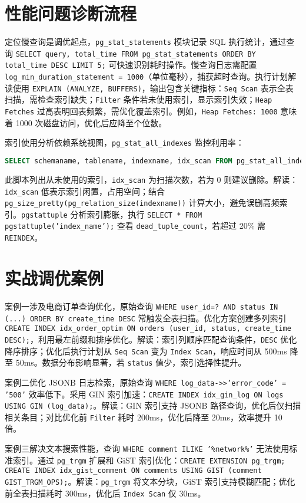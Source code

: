 \chapter{性能问题诊断流程}
定位慢查询是调优起点，\texttt{pg\_{}stat\_{}statements} 模块记录 SQL 执行统计，通过查询 \texttt{SELECT query, total\_{}time FROM pg\_{}stat\_{}statements ORDER BY total\_{}time DESC LIMIT 5;} 可快速识别耗时操作。慢查询日志需配置 \texttt{log\_{}min\_{}duration\_{}statement = 1000}（单位毫秒），捕获超时查询。执行计划解读使用 \texttt{EXPLAIN (ANALYZE, BUFFERS)}，输出包含关键指标：\texttt{Seq Scan} 表示全表扫描，需检查索引缺失；\texttt{Filter} 条件若未使用索引，显示索引失效；\texttt{Heap Fetches} 过高表明回表频繁，需优化覆盖索引。例如，\texttt{Heap Fetches: 1000} 意味着 1000 次磁盘访问，优化后应降至个位数。\par
索引使用分析依赖系统视图，\texttt{pg\_{}stat\_{}all\_{}indexes} 监控利用率：\par
\begin{lstlisting}[language=sql]
SELECT schemaname, tablename, indexname, idx_scan FROM pg_stat_all_indexes WHERE idx_scan = 0;
\end{lstlisting}
此脚本列出从未使用的索引，\texttt{idx\_{}scan} 为扫描次数，若为 0 则建议删除。解读：\texttt{idx\_{}scan} 低表示索引闲置，占用空间；结合 \texttt{pg\_{}size\_{}pretty(pg\_{}relation\_{}size(indexname))} 计算大小，避免误删高频索引。\texttt{pgstattuple} 分析索引膨胀，执行 \texttt{SELECT * FROM pgstattuple('index\_{}name');} 查看 \texttt{dead\_{}tuple\_{}count}，若超过 20\%{} 需 \texttt{REINDEX}。\par
\chapter{实战调优案例}
案例一涉及电商订单查询优化，原始查询 \texttt{WHERE user\_{}id=? AND status IN (...) ORDER BY create\_{}time DESC} 常触发全表扫描。优化方案创建多列索引 \texttt{CREATE INDEX idx\_{}order\_{}optim ON orders (user\_{}id, status, create\_{}time DESC);}，利用最左前缀和排序优化。解读：索引列顺序匹配查询条件，\texttt{DESC} 优化降序排序；优化后执行计划从 \texttt{Seq Scan} 变为 \texttt{Index Scan}，响应时间从 500ms 降至 50ms。数据分布影响显著，若 \texttt{status} 值少，索引选择性提升。\par
案例二优化 JSONB 日志检索，原始查询 \texttt{WHERE log\_{}data->>'error\_{}code' = '500'} 效率低下。采用 GIN 索引加速：\texttt{CREATE INDEX idx\_{}gin\_{}log ON logs USING GIN (log\_{}data);}。解读：GIN 索引支持 JSONB 路径查询，优化后仅扫描相关条目；对比优化前 \texttt{Filter} 耗时 200ms，优化后降至 20ms，效率提升 10 倍。\par
案例三解决文本搜索性能，查询 \texttt{WHERE comment ILIKE '\%{}network\%{}'} 无法使用标准索引。通过 \texttt{pg\_{}trgm} 扩展和 GiST 索引优化：\texttt{CREATE EXTENSION pg\_{}trgm; CREATE INDEX idx\_{}gist\_{}comment ON comments USING GIST (comment GIST\_{}TRGM\_{}OPS);}。解读：\texttt{pg\_{}trgm} 将文本分块，GiST 索引支持模糊匹配；优化前全表扫描耗时 300ms，优化后 \texttt{Index Scan} 仅 30ms。\par
